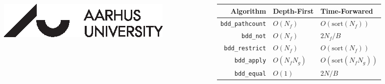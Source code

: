 \documentclass[english, aspectratio=169]{beamer}
\newcommand{\sort}[0]{\text{sort}}
\begin{document}
\begin{frame}
\begin{columns}
\begin{column}{0.4\linewidth}
      \includegraphics[width=0.5\linewidth]{../external/aulogo_uk_var2_black.eps}
    \end{column}
    \begin{column}{0.6\linewidth}
      \begin{table}
        \centering
        \begin{tabular}{rll}
          Algorithm                 & Depth-First  & Time-Forwared
          \\ \hline \hline
          \lstinline{bdd_pathcount} & $O(N_f)$     & $O(\sort(N_f))$
          \\ \hline
          \lstinline{bdd_not}       & $O(N_f)$     & $2 N_f / B$
          \\
          \lstinline{bdd_restrict}  & $O(N_f)$     & $O(\sort(N_f))$
          \\
          \lstinline{bdd_apply}     & $O(N_f N_g)$ & $O(\sort(N_f  N_g))$
          \\ \hline
          \lstinline{bdd_equal}     & $O(1)$       & $2 N/B$
        \end{tabular}
      \end{table}
    \end{column}
  \end{columns}

\end{frame}
\end{document}
